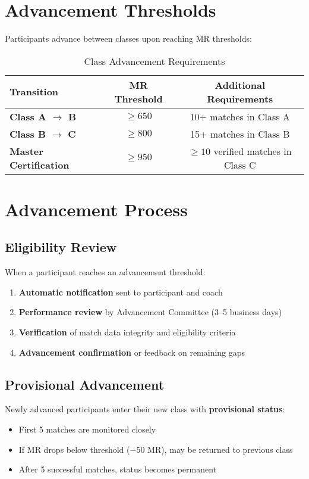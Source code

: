 \section{Advancement Thresholds}

Participants advance between classes upon reaching MR thresholds:

\begin{table}[h]
\centering
\begin{tabular}{@{}lcc@{}}
\toprule
\textbf{Transition} & \textbf{MR Threshold} & \textbf{Additional Requirements} \\ \midrule
\textbf{Class A $\rightarrow$ B} & $\geq 650$ & 10+ matches in Class A \\
\textbf{Class B $\rightarrow$ C} & $\geq 800$ & 15+ matches in Class B \\
\textbf{Master Certification} & $\geq 950$ & $\geq 10$ verified matches in Class C \\ \bottomrule
\end{tabular}
\caption{Class Advancement Requirements}
\label{tab:advancement_requirements}
\end{table}

\section{Advancement Process}

\subsection{Eligibility Review}

When a participant reaches an advancement threshold:
\begin{enumerate}
  \item \textbf{Automatic notification} sent to participant and coach
  \item \textbf{Performance review} by Advancement Committee (3–5 business days)
  \item \textbf{Verification} of match data integrity and eligibility criteria
  \item \textbf{Advancement confirmation} or feedback on remaining gaps
\end{enumerate}

\subsection{Provisional Advancement}

Newly advanced participants enter their new class with \textbf{provisional status}:
\begin{itemize}[leftmargin=*]
  \item First 5 matches are monitored closely
  \item If MR drops below threshold ($-50$ MR), may be returned to previous class
  \item After 5 successful matches, status becomes permanent
\end{itemize}

